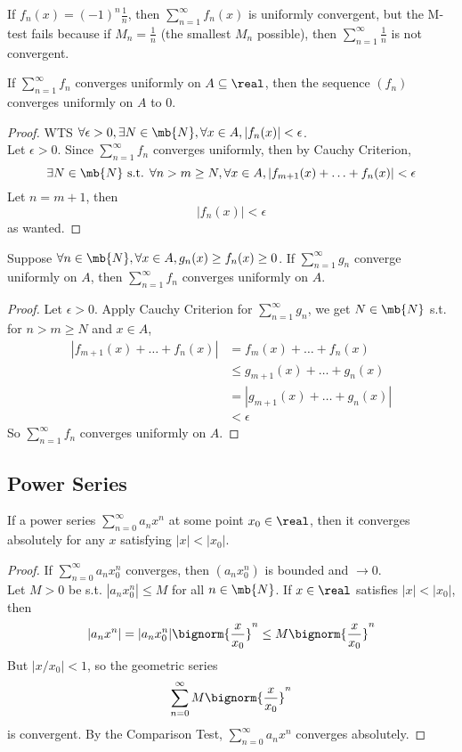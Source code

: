 \documentclass[11pt]{article}
\begin{document}
\example If $f_n(x) = (-1)^n\frac{1}{n}$, then $\sum_{n=1}^\infty f_n(x)$ is uniformly convergent, but the M-test fails because if $M_n = \frac{1}{n}$ (the smallest $M_n$ possible), then $\sum_{n=1}^\infty \frac{1}{n}$ is not convergent.


\corollary If $\sum_{n=1}^\infty f_n$ converges uniformly on $A \subseteq \real$, then the sequence $(f_n)$ converges uniformly on $A$ to 0.
\begin{proof}
	WTS $\forall \epsilon > 0, \exists N \in \mb{N}, \forall x \in A, |f_n(x)| < \epsilon$.\\
	Let $\epsilon > 0$. Since $\sum_{n=1}^\infty f_n$ converges uniformly, then by Cauchy Criterion, 
	$$\exists N \in \mb{N} \text{ s.t. } \forall n > m \geq N, \forall x \in A, |f_{m+1}(x) + \hdots + f_n(x)|< \epsilon$$
	Let $n = m+1$, then
	$$|f_n(x)| < \epsilon$$
	as wanted.
\end{proof}

\corollary Suppose $\forall n \in \mb{N}, \forall x \in A, g_n(x) \geq f_n(x) \geq 0$. If $\sum_{n=1}^\infty g_n$ converge uniformly on $A$, then $\sum_{n=1}^\infty f_n$ converges uniformly on $A$.
\begin{proof}
	Let $\epsilon > 0$. Apply Cauchy Criterion for $\sum_{n=1}^\infty g_n$, we get $N \in \mb{N}$ s.t. for $n > m \geq N$ and $x \in A$,
	\begin{align*}
		|f_{m+1}(x) + \hdots + f_n(x) | &= f_m(x) + \hdots + f_n(x) \\
		&\leq g_{m+1}(x) + \hdots + g_n(x) \\
		&= |g_{m+1}(x) + \hdots + g_n(x) |\\
		&< \epsilon
	\end{align*}
So $\sum_{n=1}^\infty f_n$ converges uniformly on $A$.
\end{proof}

\subsection{Power Series}
\theorem If a power series $\sum_{n=0}^\infty a_nx^n$  at some point $x_0 \in \real$, then it converges absolutely for any $x$ satisfying $|x| < |x_0|$.
\begin{proof}
	If $\sum_{n=0}^\infty a_nx_0^n$ converges, then $(a_nx_0^n)$ is bounded and $\rightarrow 0$.\\
	Let $M > 0$ be s.t. $|a_nx_0^n| \leq M$ for all $n \in \mb{N}$. If $x \in \real$ satisfies $|x| < |x_0|$, then
	$$|a_nx^n| = |a_nx_0^n|\bignorm{\frac{x}{x_0}}^n \leq M\bignorm{\frac{x}{x_0}}^n$$
	But $|x / x_0| < 1$, so the geometric series
	$$\sum_{n=0}^\infty M \bignorm{\frac{x}{x_0}}^n$$ 
	is convergent. By the Comparison Test, $\sum_{n=0}^\infty a_nx^n$ converges absolutely.
\end{proof} 
\end{document}
